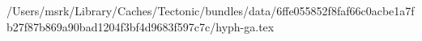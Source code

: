 /Users/msrk/Library/Caches/Tectonic/bundles/data/6ffe055852f8faf66c0acbe1a7fb27f87b869a90bad1204f3bf4d9683f597c7c/hyph-ga.tex